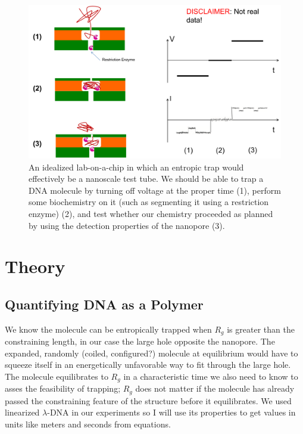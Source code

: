\documentclass[aps,prl,preprint,groupedaddress]{revtex4}
\begin{document}
\begin{figure}
\centering
\includegraphics[width=1\textwidth]{figures/idealized-trapping}
\caption{An idealized lab-on-a-chip in which an entropic trap would effectively be a nanoscale test tube. We should be able to trap a DNA molecule by turning off voltage at the proper time (1), perform some biochemistry on it (such as segmenting it using a restriction enzyme) (2), and test whether our chemistry proceeded as planned by using the detection properties of the nanopore (3).}
\label{fig:trapped-and-snipped}
\end{figure}
\section{Theory}

\subsection{Quantifying DNA as a Polymer}

We know the molecule can be entropically trapped when \(R_g\) is greater than the constraining length, in our case the large hole opposite the nanopore.
The expanded, randomly (coiled, configured?) molecule at equilibrium would have to squeeze itself in an energetically unfavorable way to fit through the large hole.\cite{trapping}
The molecule equilibrates to \(R_g\) in a characteristic time we also need to know to asses the feasibility of trapping;
\(R_g\) does not matter if the molecule has already passed the constraining feature of the structure before it equilibrates.
We used linearized \(\lambda\)-DNA in our experiments so I will use its properties to get values in units like meters and seconds from equations.
\end{document}
